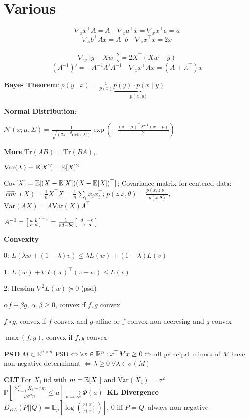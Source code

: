 \section*{Various}

$$\nabla_x x^\top A = A \quad \nabla_x a^\top x = \nabla_x x^\top a = a$$
$$\nabla_x b^\top A x = A^\top b \quad \nabla_x x^\top x = 2x$$\\[-20pt]
$$\nabla_w || y-Xw||_2^2 = 2X^\top(Xw-y)$$
$$(A^{-1})' = -A^{-1} A' A^{-1} \quad \nabla_x x^\top A x = (A + A^\top)x$$

\textbf{Bayes Theorem}: $p(y \; | \; x) = \frac{1}{p(x)} \underbrace{p(y) \cdot p(x \; | \; y)}_{p(x,y)}$

\textbf{Normal Distribution}:

$\mathcal{N}(x; \mu, \Sigma) = \frac{1}{\sqrt{(2 \pi)^d \text{det}(\Sigma)}} \exp(-\frac{(x - \mu)^\top \Sigma^{-1} (x-\mu)}{2})$

\textbf{More} $\text{Tr}(AB) = \text{Tr}(BA)$, 

$\text{Var}(X) = \mathbb{E}[X^2] - \mathbb{E}[X]^2$
 
Cov$[X] = \mathbb{E}[(X- \mathbb{E}[X])(X- \mathbb{E}[X])^\top]$;
Covariance matrix for centered data: $
\widehat{\operatorname{cov}}(X)=\frac{1}{n}X^\top X=\frac{1}{n}\sum_i x_ix_i^\top
$; $p(z|x,\theta) = \frac{p(x,z|\theta)}{p(x | \theta)}$, $\text{Var}(AX) = A \text{Var}(X) A^\top$

$A^{-1}=
\begin{bsmallmatrix}
a&b \\ 
c&d
\end{bsmallmatrix}^{-1}=\frac{1}{ad-bc}
\begin{bsmallmatrix}
d&-b \\ 
-c&a
\end{bsmallmatrix}
$

\textbf{Convexity}

0: $L(\lambda w + (1 - \lambda)v) \leq \lambda L (w) + (1- \lambda) L(v)$

1: $L(w) + \nabla L(w)^\top (v - w) \leq L(v)$

2: Hessian $\nabla^2 L (w) \succcurlyeq 0$ (psd)

\begin{rowlist}
	\item $\alpha f + \beta g$, $\alpha, \beta \geq 0$, convex if $f, g$ convex
	\item $f \circ g$, convex if $f$ convex and $g$ affine or $f$ convex non-decresing and $g$ convex
	\item $\max(f, g)$, convex if $f,g$ convex
\end{rowlist}

\textbf{PSD}
$M \in \mathbb{R}^{n\times n}$ PSD $\Leftrightarrow \forall x \in \mathbb{R}^n: x^\top Mx \geq 0 \\
\Leftrightarrow$ all principal minors of $M$ have non-negative determinant $\Leftrightarrow \lambda \geq 0 \ \forall \lambda\in\sigma(M)$

\textbf{CLT} For $X_i$ iid with $m = \mathbb{E}[X_1]$ and $\text{Var}(X_1) = \sigma^2$: $\mathbb{P}\left[\frac{\sum_{i=1}^n X_i - n m}{\sqrt{\sigma^2 n}} \leq a\right] \xrightarrow[n \to \infty]{} \Phi(a)$.
\textbf{KL Divergence} $D_{KL}(P||Q) = \mathbb{E}_p[\log(\frac{p(x)}{q(x)})]$, 0 iff $P = Q$, always non-negative

